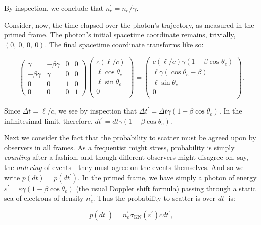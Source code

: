 \documentclass[letterpaper]{article}
\begin{document}
\begin{enumerate}
\noindent By inspection, we conclude that $n_e^\prime = n_e/\gamma$.

Consider, now, the time elapsed over the photon's trajectory, as measured in the primed frame. The photon's initial spacetime coordinate remains, trivially, $(0,\ 0,\ 0,\ 0)$. The final spacetime coordinate transforms like so:

\begin{equation}
\begin{pmatrix}
\gamma & -\beta \gamma & 0 & 0 \\
-\beta \gamma & \gamma & 0 & 0 \\
0 & 0 & 1 & 0 \\
0 & 0 & 0 & 1
\end{pmatrix}
\begin{pmatrix}
c(\ell/c) \\
\ell \cos \theta_e \\
\ell \sin \theta_e \\
0 \\
\end{pmatrix}
=
\begin{pmatrix}
c (\ell / c) \gamma (1 - \beta \cos \theta_e) \\
\ell \gamma (\cos \theta_e - \beta) \\
\ell \sin \theta_e \\
0 \\
\end{pmatrix}.
\end{equation}

\noindent Since $\Delta t = \ell / c$, we see by inspection that $\Delta t^\prime = \Delta t \gamma (1 - \beta \cos \theta_e)$. In the infinitesimal limit, therefore, $dt^\prime = dt \gamma (1 - \beta \cos \theta_e)$.

Next we consider the fact that the probability to scatter must be agreed upon by observers in all frames. As a frequentist might stress, probability is simply \emph{counting} after a fashion, and though different observers might disagree on, say, the \emph{ordering} of events---they must agree on the events themselves. And so we write $p(dt) = p(dt^\prime)$. In the primed frame, we have simply a photon of energy $\varepsilon^\prime = \varepsilon \gamma (1 - \beta \cos \theta_e)$ (the usual Doppler shift formula) passing through a static sea of electrons of density $n_e^\prime$. Thus the probability to scatter is over $dt^\prime$ is:

\begin{equation}
p(dt^\prime) = n_e^\prime \sigma_\mathrm{KN} (\varepsilon^\prime) c dt^\prime,
\end{equation}


\end{enumerate}
\end{document}
